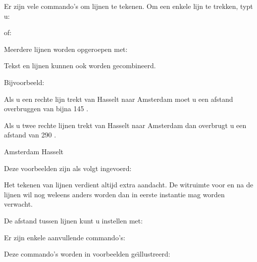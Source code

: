 
Er zijn vele commando's om lijnen te tekenen. Om een enkele
lijn te trekken, typt u:


of:


Meerdere lijnen worden opgeroepen met:


Tekst en lijnen kunnen ook worden gecombineerd.


Bijvoorbeeld:

\startbuffer
{}
Als u een rechte lijn trekt van Hasselt naar Amsterdam moet
u een afstand overbruggen van bijna 145 \Kilo \Meter.
\stoptekstlijn

Als u twee rechte lijnen trekt van Hasselt naar Amsterdam
dan overbrugt u een afstand van 290 \Kilo \Meter.

Amsterdam \dunnelijnen[n=3] Hasselt
\stopbuffer

\haalbuffer

Deze voorbeelden zijn als volgt ingevoerd:

\typebuffer

Het tekenen van lijnen verdient altijd extra aandacht. De
witruimte voor en na de lijnen wil nog weleens anders worden
dan in eerste instantie mag worden verwacht.

De afstand tussen lijnen kunt u instellen met:


Er zijn enkele aanvullende commando's:


Deze commando's worden in voorbeelden ge\"{\i}llustreerd:

\startbuffer
\stelinvullijnenin[breedte=2cm]
\stelinvulregelsin[breedte=3cm]


 \par

